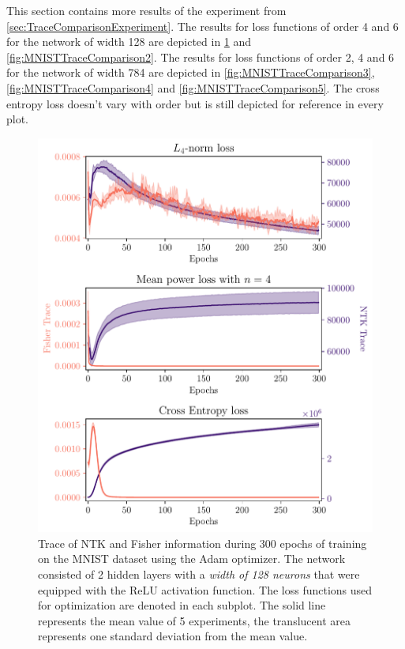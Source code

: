 This section contains more results of the experiment from \cref{sec:TraceComparisonExperiment}. The results for loss functions of order 4 and 6 for the network of width 128 are depicted in \cref{fig:MNISTTraceComparison1} and \cref{fig:MNISTTraceComparison2}. The results for loss functions of order 2, 4 and 6 for the network of width 784 are depicted in \cref{fig:MNISTTraceComparison3}, \cref{fig:MNISTTraceComparison4} and \cref{fig:MNISTTraceComparison5}. The cross entropy loss doesn't vary with order but is still depicted for reference in every plot.

\begin{figure}
	\centering
	\includegraphics[width=\textwidth]{text/results/FisherNTKComparisonPlots/Triple_comparison_losses4_128.pdf}
	\caption{Trace of NTK and Fisher information during 300 epochs of training on the MNIST dataset using the Adam optimizer. The network consisted of 2 hidden layers with a \emph{width of 128 neurons} that were equipped with the ReLU activation function. The loss functions used for optimization are denoted in each subplot. The solid line represents the mean value of 5 experiments, the translucent area represents one standard deviation from the mean value.}
	\label{fig:MNISTTraceComparison1}
\end{figure}
